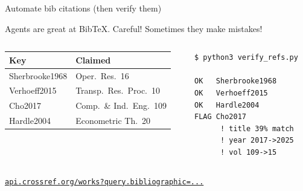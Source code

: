 \documentclass[aspectratio=169,11pt]{beamer}
\newcommand{\link}[2]{\href{#1}{\footnotesize\texttt{#2}}}
\begin{document}
\begin{frame}[fragile]{Automate bib citations (then verify them)}

{\small Agents are great at BibTeX. Careful! Sometimes they make mistakes!}

\vspace{0.4em}
\begin{columns}[T]
\begin{column}{0.40\textwidth}
{\scriptsize
\begin{tabular}{@{}ll@{}}
\toprule
\textbf{Key} & \textbf{Claimed} \\
\midrule
Sherbrooke1968 & Oper.\ Res.\ 16 \\
Verhoeff2015 & Transp.\ Res.\ Proc.\ 10 \\
\rowcolor{fcred!12} Cho2017 & Comp.\ \& Ind.\ Eng.\ 109 \\
Hardle2004 & Econometric Th.\ 20 \\
\bottomrule
\end{tabular}}

\vspace{0.7em}
\begin{center}
\end{center}
\end{column}

\begin{column}{0.58\textwidth}
\begin{Verbatim}[fontsize=\scriptsize,frame=single,rulecolor=\color{darkgray}]
$ python3 verify_refs.py

OK   Sherbrooke1968
OK   Verhoeff2015
OK   Hardle2004
FLAG Cho2017
      ! title 39% match
      ! year 2017->2025
      ! vol 109->15
\end{Verbatim}
\end{column}
\end{columns}

\vspace{0.2em}
\link{https://api.crossref.org/works?query.bibliographic=METRIC+multi-echelon+recoverable+item+Sherbrooke}{api.crossref.org/works?query.bibliographic=...}
\end{frame}
\end{document}
